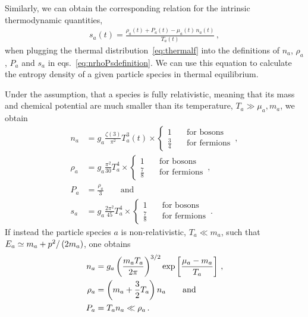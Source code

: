 Similarly, we can obtain the corresponding relation for the intrinsic thermodynamic quantities, 
\begin{align}
	s_a(t) = \frac{\rho_a(t) + P_a(t) - \mu_a(t) \, n_a(t)}{T_a(t) } \label{eq:2ndlawDensity} \, ,
\end{align}
when plugging the thermal distribution~\eqref{eq:thermalf} into the definitions of $n_a$, $\rho_a$, $P_a$ and $s_a$ in eqs.~\eqref{eq:nrhoPsdefinition}. We can use this equation to calculate the entropy density of a given particle species in thermal equilibrium.

Under the  assumption, that a species is fully relativistic, meaning that its mass and chemical potential are much smaller than its temperature, $T_a \gg \mu_a, m_a$, we obtain
\begin{subequations}
	\begin{align}
		n_a &= g_a \frac{\zeta(3)}{\pi^2} T_a^3(t) \times \begin{cases}
			1 \quad & \text{for bosons}\\
			\frac{3}{4} \quad &\text{for fermions}
		\end{cases} \label{eq:nrel}  \, ,\\
		\rho_a &= g_a \frac{\pi^2}{30} T_a^4 \times \begin{cases}
			1 \quad & \text{for bosons}\\
			\frac{7}{8} \quad &\text{for fermions}
		\end{cases}  \, , \label{eq:rhorel}\\
		P_a &= \frac{\rho_a}{3} \qquad \text{and} \label{eq:Prel} \\
		s_a & = g_a \frac{2 \pi^2}{45} T_a^4 \times \begin{cases}
			1 \quad & \text{for bosons}\\
			\frac{7}{8	} \quad &\text{for fermions}
		\end{cases} \label{eq:srel}  \, .
	\end{align}
\end{subequations}
If instead the particle species $a$ is non-relativistic, $T_a \ll m_a$, such that $E_a\simeq m_a + p^2 / \left( 2 m_a \right)$, one obtains
\begin{subequations}
	\begin{align}
		n_a &= g_a \left( \frac{m_a T_a}{2 \pi} \right)^{3/2} \exp \left[ \frac{\mu_a- m_a}{T_a} \right]  \label{eq:nnonrel} \, ,\\
		\rho_a &= \left( m_a + \frac{3}{2} T_a \right) n_a   \label{eq:rhononrel} \qquad \text{and}\\
		P_a &= T_a n_a \ll \rho_a \, .  \label{eq:Pnonrel}
	\end{align}
\end{subequations}
